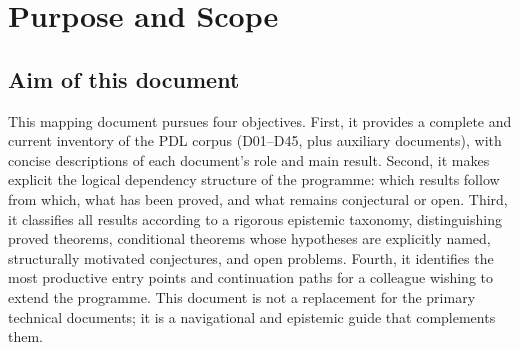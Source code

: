 \documentclass[11pt,a4paper]{article}
\theoremstyle{plain}
\theoremstyle{definition}
\theoremstyle{remark}
\begin{document}
\begin{abstract}
\begin{itemize}
\item D44 derives the hierarchical filter factor $k = 0.921716$ from C1--C4 as an unconditional theorem (OP-B resolved). The complete causal chain C1--C4 $\to$ $K_4$ $\to$ quintuplet $\to$ $\varepsilon_{\mathrm{geom}}$ $\to$ $\varepsilon_G = \varepsilon_{\mathrm{geom}} \times k^{18}$ $\to$ $G$ is now fully closed with no remaining open problem and no free parameter beyond $\Delta m_{\mathrm{iso}}$.
\item D45 derives the first falsifiable astrophysical confrontation: the primordial black hole survival threshold is shifted upward by $+11.89\%$ relative to the standard GR value, giving $M^*_{\mathrm{PDL}} = \sigma(40)^{-2/3}\,M^*_{\mathrm{GR}} \approx 5.706 \times 10^{14}$\,g, testable with existing Fermi-LAT data via \textsc{BlackHawk} and \textsc{Isatis}.
\end{itemize}
There is no longer any foundational open problem at the axiomatic level. The remaining open problems (OP2--OP17) concern higher-level derivations, extensions, and experimental confrontations.
\end{abstract}

\tableofcontents

\section{Purpose and Scope}
\label{sec:purpose}

\subsection{Aim of this document}
\label{subsec:aim}
This mapping document pursues four objectives. First, it provides a complete and current inventory of the PDL corpus (D01--D45, plus auxiliary documents), with concise descriptions of each document's role and main result. Second, it makes explicit the logical dependency structure of the programme: which results follow from which, what has been proved, and what remains conjectural or open. Third, it classifies all results according to a rigorous epistemic taxonomy, distinguishing proved theorems, conditional theorems whose hypotheses are explicitly named, structurally motivated conjectures, and open problems. Fourth, it identifies the most productive entry points and continuation paths for a colleague wishing to extend the programme. This document is not a replacement for the primary technical documents; it is a navigational and epistemic guide that complements them.
\end{document}
